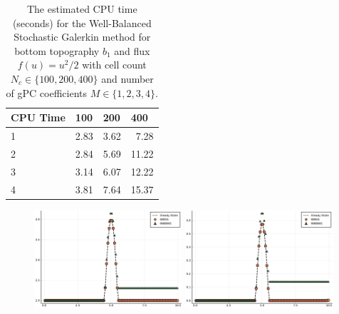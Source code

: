 \documentclass[12pt]{article}
\begin{document}
\begin{table}[!htb]
\centering
\begin{tabular}{@{}l|lll@{}}
\toprule
CPU Time & 100  & 200  & 400   \\ \midrule
1        & 2.83 & 3.62 & \ 7.28  \\
2        & 2.84 & 5.69 & 11.22 \\
3        & 3.14 & 6.07 & 12.22 \\
4        & 3.81 & 7.64 & 15.37 \\ \bottomrule
\end{tabular}
\caption{The estimated CPU time (seconds) for the Well-Balanced Stochastic Galerkin method for bottom topography $b_1$ and flux $f(u) = u^2/2$ with cell count $N_c \in \{100, 200, 400\}$ and number of gPC coefficients $M \in \{1,2,3,4\}$.}
\label{tab:cpu-time}
\end{table}

\begin{figure}[!htb]
    \centering
    \includegraphics[width=0.49\textwidth]{Figures/mean_sgwb}
    \includegraphics[width=0.49\textwidth]{Figures/sd_sgwb}
    \caption{}
    \label{fig:b1}
\end{figure}
\end{document}
